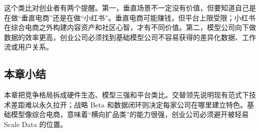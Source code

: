 这个类比对创业者有两个提醒。第一，垂直场景不一定没有价值，但要知道自己是在做“垂直电商”还是在做“小红书”。垂直电商可能赚钱，但平台上限受限；小红书在综合电商之外构建内容资产和社区心智，才有不同价值。第二，模型公司向下做数据的效率更高，创业公司必须找到基础模型公司不容易获得的差异化数据、工作流或用户关系。

\subsection{本章小结}

本章把竞争格局拆成硬件生态、模型三强和平台类比。交替领先说明现有范式下技术差距难以永久拉开；战略 Beta 和数据闭环则决定每家公司在哪里建立特色。基础模型像综合电商，意味着“横向扩品类”的能力很强，创业公司必须避开被轻易 Scale Data 的位置。

